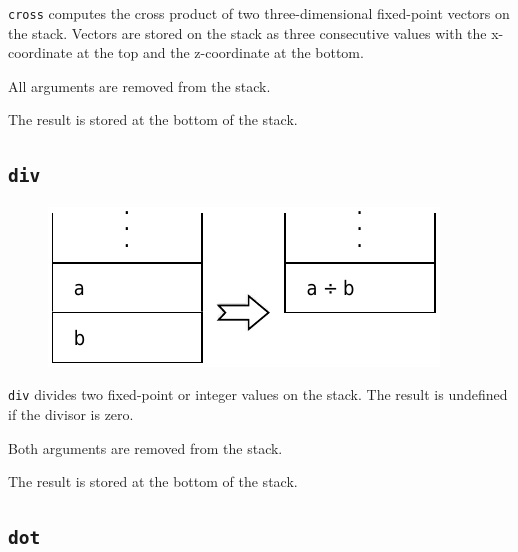 			\texttt{cross} computes the cross product of two three-dimensional
			fixed-point vectors on the stack. Vectors are stored on the stack
			as three consecutive values with the x-coordinate at the top and
			the z-coordinate at the bottom.
			
			All arguments are removed from the stack.
			
			The result is stored at the bottom of the stack.
	
	\qquad\qquad
	
	\subsection*{\texttt{div}}
	
		\begin{figure}
			\begin{flushright}
				\includegraphics[width=\linewidth]{figure/pdf/i_div} 
			\end{flushright}
		\end{figure}
	
			\texttt{div} divides two fixed-point or integer values on the
			stack.  The result is undefined if the divisor is zero.
			
			Both arguments are removed from the stack.
			
			The result is stored at the bottom of the stack.
	
	\qquad
	
	\subsection*{\texttt{dot}}
	
